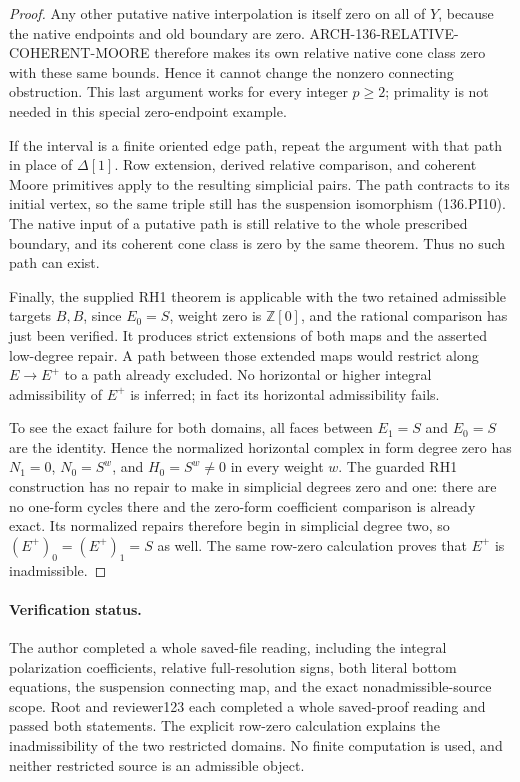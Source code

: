 \begin{proof}
Any other putative native interpolation is itself zero on all
of \(Y\), because the native endpoints and old boundary are
zero.  ARCH-136-RELATIVE-COHERENT-MOORE therefore makes its own
relative native cone class zero with these same bounds.  Hence
it cannot change the nonzero connecting obstruction.  This last
argument works for every integer \(p\geq2\); primality is not
needed in this special zero-endpoint example.

If the interval is a finite oriented edge path, repeat the
argument with that path in place of \(\Delta[1]\).  Row
extension, derived relative comparison, and coherent Moore
primitives apply to the resulting simplicial pairs.  The path
contracts to its initial vertex, so the same triple still has
the suspension isomorphism (136.PI10).  The native input of a
putative path is still relative to the whole prescribed boundary,
and its coherent cone class is zero by the same theorem.  Thus
no such path can exist.

Finally, the supplied RH1 theorem is applicable with the two
retained admissible targets \(B,B\), since \(E_0=S\), weight
zero is \(\mathbb Z[0]\), and the rational comparison has
just been verified.  It produces strict extensions of both maps
and the asserted low-degree repair.  A path between those extended
maps would restrict along \(E\to E^+\) to a path already
excluded.  No horizontal or higher integral admissibility of
\(E^+\) is inferred; in fact its horizontal admissibility fails.

To see the exact failure for both domains, all faces between
\(E_1=S\) and \(E_0=S\) are the identity.  Hence the normalized
horizontal complex in form degree zero has \(N_1=0\),
\(N_0=S^w\), and \(H_0=S^w\ne0\) in every weight \(w\).
The guarded RH1 construction has no repair to make in simplicial
degrees zero and one: there are no one-form cycles there and
the zero-form coefficient comparison is already exact.  Its
normalized repairs therefore begin in simplicial degree two,
so \((E^+)_0=(E^+)_1=S\) as well.  The same row-zero
calculation proves that \(E^+\) is inadmissible.
\end{proof}

\paragraph{Verification status.}
The author completed a whole saved-file reading, including the
integral polarization coefficients, relative full-resolution signs,
both literal bottom equations, the suspension connecting map, and
the exact nonadmissible-source scope.  Root and reviewer123 each
completed a whole saved-proof reading and passed both statements.
The explicit row-zero calculation explains the inadmissibility
of the two restricted domains.  No finite computation is used, and
neither restricted source is an admissible object.
